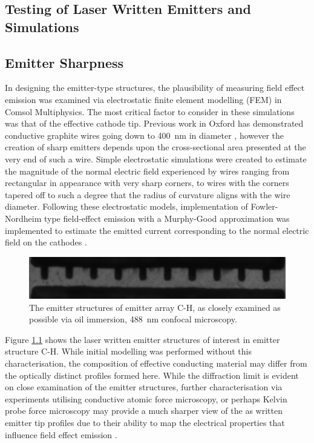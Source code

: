 \begin{refsection}
\chapter{Testing of Laser Written Emitters and Simulations} %
\section{Emitter Sharpness}
\label{subsec:emitter_sharpness}
In designing the emitter-type structures, the plausibility of measuring field effect emission was examined via electrostatic finite element modelling (FEM) in Comsol Multiphysics. The most critical factor to consider in these simulations was that of the effective cathode tip. Previous work in Oxford has demonstrated conductive graphite wires going down to 400~\si{\nano\metre} in diameter \cite{sun2014}, however the creation of sharp emitters depends upon the cross-sectional area presented at the very end of such a wire. Simple electrostatic simulations were created to estimate the magnitude of the normal electric field experienced by wires ranging from rectangular in appearance with very sharp corners, to wires with the corners tapered off to such a degree that the radius of curvature aligns with the wire diameter. Following these electrostatic models, implementation of Fowler-Nordheim type field-effect emission with a Murphy-Good approximation was implemented to estimate the emitted current corresponding to the normal electric field on the cathodes \cite{Good1956, Kyritsakis2015, Forbes2019}.

\begin{figure}[H]
    \centering
    \includegraphics[width=\textwidth]{Chapter7/Figs/ch_channel_esid_tiny.png}
    \caption{The emitter structures of emitter array C-H, as closely examined as possible via oil immersion, 488~\si{\nano\metre} confocal microscopy.}
    \label{fig:ch_tiny_ohgod}
\end{figure}

Figure \ref{fig:ch_tiny_ohgod} shows the laser written emitter structures of interest in emitter structure C-H. While initial modelling was performed without this characterisation, the composition of effective conducting material may differ from the optically distinct profiles formed here. While the diffraction limit is evident on close examination of the emitter structures, further characterisation via experiments utilising conductive atomic force microscopy, or perhaps Kelvin probe force microscopy may provide a much sharper view of the as written emitter tip profiles due to their ability to map the electrical properties that influence field effect emission \cite{Melitz2011, Mikulik2017}.


\end{refsection}

